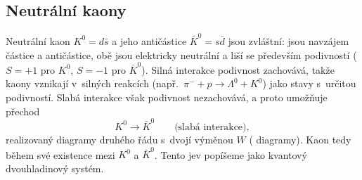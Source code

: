 \subsection{Neutrální kaony}

Neutrální kaon $K^0=d\bar s$ a jeho antičástice $\bar K^0 = s\bar d$ jsou zvláštní: jsou navzájem částice a antičástice, obě jsou elektricky neutrální a liší se především podivností ($S=+1$ pro $K^0$, $S=-1$ pro $\bar K^0$). Silná interakce podivnost zachovává, takže kaony vznikají v~silných reakcích (např.\ $\pi^-+p\to\Lambda^0+K^0$) jako stavy s~určitou podivností. Slabá interakce však podivnost nezachovává, a proto umožňuje přechod
\begin{equation}
  K^0 \to \bar K^0 \qquad \text{(slabá interakce)},
\end{equation}
realizovaný diagramy druhého řádu s~dvojí výměnou $W$ ( diagramy). Kaon tedy během své existence  mezi $K^0$ a $\bar K^0$. Tento jev popíšeme jako kvantový dvouhladinový systém.


